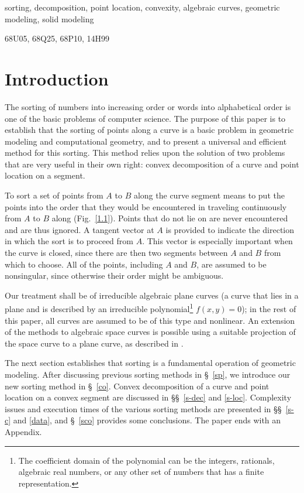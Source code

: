 \begin{keywords}
sorting, decomposition, point location, convexity, algebraic curves,
geometric modeling, solid modeling
\end{keywords}

\begin{AMSMOS}
68U05, 68Q25, 68P10, 14H99
\end{AMSMOS}

\section{Introduction}
%
The sorting of numbers into increasing order or words 
into alphabetical order is one of the basic problems of computer science.  
The purpose of this paper is to establish that the sorting of points
along a curve is a basic problem in geometric modeling and computational geometry,
and to present a universal and efficient method for this sorting.
This method relies upon the solution of two problems that are very useful in their
own right: convex decomposition of a curve and point location on a segment.

To sort a set of points from $A$ to $B$ along the curve segment  means to
put the points into the order that they would be encountered in traveling
continuously from $A$ to $B$ along  (Fig.~\ref{1.1}).
Points that do not lie on  are never encountered and are thus ignored.
A tangent vector at $A$ is provided to indicate the direction in which the sort is to
proceed from $A$. 
This vector is especially important when the curve is closed, since
there are then two segments between $A$ and $B$ from which to choose.
All of the points, including $A$ and $B$, are assumed to be nonsingular,
since otherwise their order might be ambiguous.
%

Our treatment shall be of irreducible algebraic plane curves (a curve that 
lies in a plane and is described by an irreducible polynomial\footnote{The coefficient
	domain of the polynomial can be the integers, rationals, algebraic real numbers,
	or any other set of numbers that has a finite representation.}
$f(x,y)=0$); 
in the rest of this paper, all curves are assumed to be of this type and nonlinear.
An extension of the methods to algebraic space curves is possible using 
a suitable projection of the space curve to a plane curve, as described in \cite{jj}.

The next section establishes that sorting is a fundamental operation of 
geometric modeling.
After discussing previous sorting methods in
\S~\ref{sp},
we introduce our new sorting method in
\S~\ref{co}.
Convex decomposition of a curve
and point location on a convex segment 
are discussed in \S\S~\ref{s-dec} 
and \ref{s-loc}.
Complexity issues and execution times of the
various sorting methods are presented in \S\S~\ref{s-c} and 
\ref{data}, and \S~\ref{sco} provides some conclusions.
The paper ends with an Appendix.


